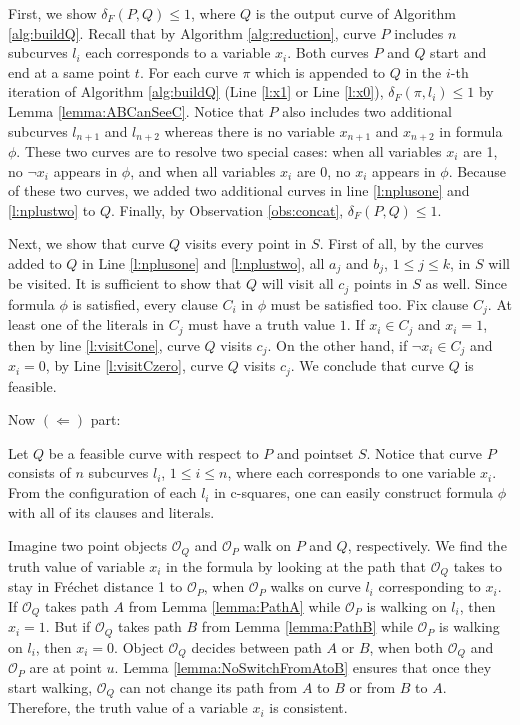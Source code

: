\documentclass[12pt]{dalthesis}
\def\favoritefont{\bfseries \sffamily}
\def\QED{\ensuremath{{\Box}}}
\def\markatright#1{\leavevmode\unskip\nobreak\quad\hspace*{\fill}{#1}}
\newenvironment{proof}
	{\begin{trivlist}\item[\hskip\labelsep{\favoritefont Proof:}]}
	{\markatright{\QED}\end{trivlist}}
\newcommand{\Frechet}{Fr\'echet }
\newcommand{\distF}{\delta_F}
\newcommand{\CO}{{\mathscr O}}
\newcommand{\pset}{S}
\newcommand{\cfev}{{l}}
\begin{document}
\begin{proof}
First, we show $\distF(P,Q) \le 1$, where $Q$
is the output curve of Algorithm \ref{alg:buildQ}.
Recall that by Algorithm \ref{alg:reduction}, 
curve $P$ includes $n$ subcurves $\cfev_{i}$ each corresponds 
to a variable $x_i$. 
Both curves $P$ and $Q$ start and end at a same point $t$.
For each curve $\pi$ which is appended to $Q$ 
in the $i$-th iteration of Algorithm \ref{alg:buildQ} 
(Line \ref{l:x1} or Line \ref{l:x0}), 
$\distF(\pi,\cfev_i) \le 1$  by Lemma \ref{lemma:ABCanSeeC}. 
Notice that $P$ also includes two additional subcurves $\cfev_{n+1}$ and $\cfev_{n+2}$ 
whereas there is no variable $x_{n+1}$ and $x_{n+2}$ in formula $\phi$. 
These two curves are to resolve two special cases: 
when all variables $x_i$ are 1,  no $\neg x_i$ appears in $\phi$,
and when all variables $x_i$ are 0,  
no $x_i$ appears in $\phi$.
Because of these two curves, 
we added two additional curves in line \ref{l:nplusone}
and \ref{l:nplustwo} to $Q$. Finally, by  Observation 
\ref{obs:concat}, $\distF(P,Q) \le 1$.


Next, we show that curve $Q$ visits every point in $S$. First of 
all, by the curves added to $Q$ 
in Line \ref{l:nplusone} and \ref{l:nplustwo}, 
all $a_j$ and $b_j$, $1\le j \le k$, in $S$ will be visited. 
It is sufficient to show that $Q$ will visit all $c_j$ points in $S$  as well.
Since  formula $\phi$ is satisfied, every clause $C_i$ in $\phi$ must be satisfied 
too. Fix clause $C_j$. At least one of the literals in $C_j$
must have a truth value $1$. If $x_i \in C_j$ and $x_i = 1$, 
then by line \ref{l:visitCone}, curve $Q$ visits $c_j$.
On the other hand, if $\neg x_i \in C_j$ and $x_i = 0$, 
by Line \ref{l:visitCzero}, curve $Q$ visits $c_j$. We conclude that 
curve $Q$ is feasible.
 

Now $(\Leftarrow)$ part:

Let $Q$ be a feasible curve with respect to $P$ and pointset $\pset$.
Notice that curve $P$ consists of $n$ subcurves $\cfev_i$, 
$1 \le i \le n $, where each corresponds to one variable $x_i$. 
From the configuration of each $\cfev_i$ in c-squares, 
one can easily construct formula $\phi$ with 
all of its clauses and literals. 



 
Imagine two point objects $\CO_Q$ 
and $\CO_P$ walk on $P$ and $Q$, respectively. 
We find the truth value of variable $x_i$ in the formula
by looking at the path that $\CO_Q$ takes to stay in \Frechet distance 1 to $\CO_P$, 
when $\CO_P$ walks on curve $\cfev_i$ corresponding to $x_i$.
If $\CO_Q$ takes path $A$ from Lemma \ref{lemma:PathA} 
while $\CO_P$ is walking on  $\cfev_i$, then $x_i = 1$. But if $\CO_Q$ takes path $B$ from Lemma \ref{lemma:PathB} 
while $\CO_P$ is walking on  $\cfev_i$, then $x_i = 0$. 
Object $\CO_Q$ decides between path $A$ or $B$,  when both $\CO_Q$ and $\CO_P$ are at point $u$. 
Lemma \ref{lemma:NoSwitchFromAtoB} ensures that  
once they start walking, 
$\CO_Q$ can not change its path from $A$ to $B$ 
or from $B$ to $A$. 
Therefore, the truth value of a variable $x_i$ is consistent.



\end{proof}
\end{document}
